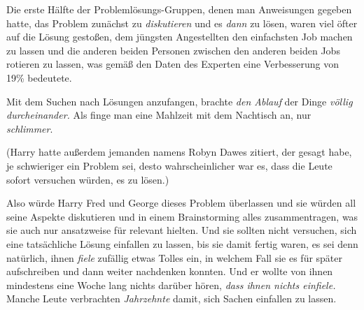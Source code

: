 Die erste Hälfte der Problemlösungs-Gruppen, denen man Anweisungen gegeben hatte, das Problem zunächst zu \emph{diskutieren} und es \emph{dann} zu lösen, waren viel öfter auf die Lösung gestoßen, dem jüngsten Angestellten den einfachsten Job machen zu lassen und die anderen beiden Personen zwischen den anderen beiden Jobs rotieren zu lassen, was gemäß den Daten des Experten eine Verbesserung von 19\% bedeutete.

Mit dem Suchen nach Lösungen anzufangen, brachte \emph{den Ablauf} der Dinge \emph{völlig durcheinander.} Als finge man eine Mahlzeit mit dem Nachtisch an, nur \emph{schlimmer}.

(Harry hatte außerdem jemanden namens Robyn Dawes zitiert, der gesagt habe, je schwieriger ein Problem sei, desto wahrscheinlicher war es, dass die Leute sofort versuchen würden, es zu lösen.)

Also würde Harry Fred und George dieses Problem überlassen und sie würden all seine Aspekte diskutieren und in einem Brainstorming alles zusammentragen, was sie auch nur ansatzweise für relevant hielten. Und sie sollten nicht versuchen, sich eine tatsächliche Lösung einfallen zu lassen, bis sie damit fertig waren, es sei denn natürlich, ihnen \emph{fiele} zufällig etwas Tolles ein, in welchem Fall sie es für später aufschreiben und dann weiter nachdenken konnten. Und er wollte von ihnen mindestens eine Woche lang nichts darüber hören, \emph{dass ihnen nichts einfiele.} Manche Leute verbrachten \emph{Jahrzehnte} damit, sich Sachen einfallen zu lassen.

